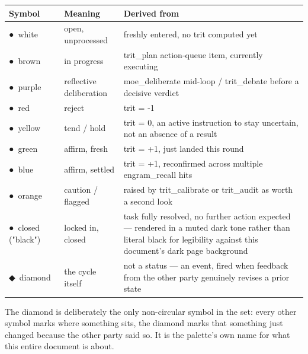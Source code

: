 \documentclass[11pt,a4paper]{article}
\begin{document}
\begin{longtable}{@{}p{2.6cm}p{4.0cm}p{7.0cm}@{}}
\toprule
\textbf{\color{rfi-white}Symbol} & \textbf{\color{rfi-white}Meaning} & \textbf{\color{rfi-white}Derived from} \\
\midrule
\endhead
\textcolor{rfi-white}{\Large ●}\ white & open, unprocessed & freshly entered, no trit computed yet \\[3pt]
\textcolor{rfi-brown}{\Large ●}\ brown & in progress & trit\_plan action-queue item, currently executing \\[3pt]
\textcolor{rfi-purple}{\Large ●}\ purple & reflective deliberation & moe\_deliberate mid-loop / trit\_debate before a decisive verdict \\[3pt]
\textcolor{rfi-red}{\Large ●}\ red & reject & trit = -1 \\[3pt]
\textcolor{rfi-yellow}{\Large ●}\ yellow & tend / hold & trit = 0, an active instruction to stay uncertain, not an absence of a result \\[3pt]
\textcolor{rfi-green}{\Large ●}\ green & affirm, fresh & trit = +1, just landed this round \\[3pt]
\textcolor{rfi-blue}{\Large ●}\ blue & affirm, settled & trit = +1, reconfirmed across multiple engram\_recall hits \\[3pt]
\textcolor{rfi-amber}{\Large ●}\ orange & caution / flagged & raised by trit\_calibrate or trit\_audit as worth a second look \\[3pt]
\textcolor{rfi-closed}{\Large ●}\ closed ("black") & locked in, closed & task fully resolved, no further action expected — rendered in a muted dark tone rather than literal black for legibility against this document's dark page background \\[3pt]
\textcolor{rfi-teal}{\Large ◆}\ diamond & the cycle itself & not a status — an event, fired when feedback from the other party genuinely revises a prior state \\[3pt]
\bottomrule
\end{longtable}

The diamond is deliberately the only non-circular symbol in the set: every other symbol marks where something sits, the diamond marks that something just changed because the other party said so. It is the palette's own name for what this entire document is about.
\end{document}
